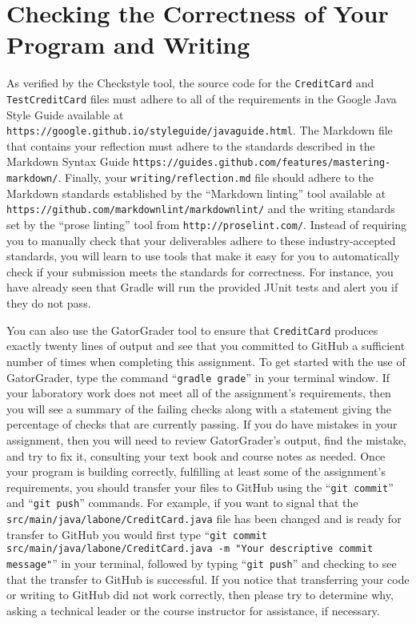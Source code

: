 \documentclass[11pt]{article}
\newcommand{\mainprogram}{\lstinline{CreditCard}}
\newcommand{\mainprogramsource}{\lstinline{src/main/java/labone/CreditCard.java}}
\newcommand{\testprogram}{\lstinline{TestCreditCard}}
\newcommand{\reflection}{\lstinline{writing/reflection.md}}
\newcommand{\gatorgraderstart}{\command{gradle grade}}
\newcommand{\gitcommit}{\command{git commit}}
\newcommand{\gitpush}{\command{git push}}
\newcommand{\gitcommitmainprogram}{\command{git commit src/main/java/labone/CreditCard.java -m "Your
descriptive commit message"}}
\newcommand{\command}[1]{``\lstinline{#1}''}
\newcommand{\url}[1]{\lstinline{#1}}
\newcommand{\step}[1]{``{#1}''}
\begin{document}
\section*{Checking the Correctness of Your Program and Writing}

As verified by the Checkstyle tool, the source code for the \mainprogram{} and
\testprogram{} files must adhere to all of the requirements in the Google Java
Style Guide available at
\url{https://google.github.io/styleguide/javaguide.html}. The Markdown file that
contains your reflection must adhere to the standards described in the Markdown
Syntax Guide \url{https://guides.github.com/features/mastering-markdown/}.
Finally, your \reflection{} file should adhere to the Markdown standards
established by the \step{Markdown linting} tool available at
\url{https://github.com/markdownlint/markdownlint/} and the writing standards
set by the \step{prose linting} tool from \url{http://proselint.com/}. Instead
of requiring you to manually check that your deliverables adhere to these
industry-accepted standards, you will learn to use tools that make it easy for
you to automatically check if your submission meets the standards for
correctness. For instance, you have already seen that Gradle will run the
provided JUnit tests and alert you if they do not pass.

You can also use the GatorGrader tool to ensure that \mainprogram{} produces
exactly twenty lines of output and see that you committed to GitHub a sufficient
number of times when completing this assignment. To get started with the use of
GatorGrader, type the command \gatorgraderstart{} in your terminal window. If
your laboratory work does not meet all of the assignment's requirements, then
you will see a summary of the failing checks along with a statement giving the
percentage of checks that are currently passing. If you do have mistakes in your
assignment, then you will need to review GatorGrader's output, find the mistake,
and try to fix it, consulting your text book and course notes as needed. Once
your program is building correctly, fulfilling at least some of the assignment's
requirements, you should transfer your files to GitHub using the \gitcommit{}
and \gitpush{} commands. For example, if you want to signal that the
\mainprogramsource{} file has been changed and is ready for transfer to GitHub
you would first type \gitcommitmainprogram{} in your terminal, followed by
typing \gitpush{} and checking to see that the transfer to GitHub is successful.
If you notice that transferring your code or writing to GitHub did not work
correctly, then please try to determine why, asking a technical leader or the
course instructor for assistance, if necessary.
\end{document}
